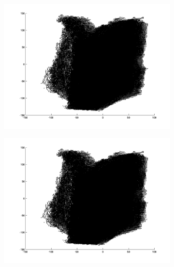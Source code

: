 \begin{figure}
	\centering
	
	\begin{subfigure}[b]{0.3\textwidth}
		\centering
		\includegraphics[width=\textwidth]{Images/Book16.png}
		\caption{}
	\end{subfigure}%
	\begin{subfigure}[b]{0.3\textwidth}
		\centering
		\includegraphics[width=\textwidth]{Images/Book17.png}
		\caption{}
	\end{subfigure}
	\begin{subfigure}[b]{0.3\textwidth}
		\centering

\end{subfigure}
\end{figure}
